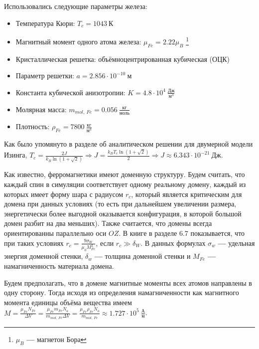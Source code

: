 \documentclass[oneside,final,14pt]{extarticle}
\begin{document}
	Использовались следующие параметры железа: 
	\begin{itemize}
	\item Температура Кюри: $T_c=1043 \ \text{К}$
	\item Магнитный момент одного атома железа: $\mu_{Fe}=2.22\mu_{B}$ \footnote{$\mu_{B}$ \textbf{---} магнетон Бора}
	\item Кристаллическая решетка: объёмноцентрированная кубическая (ОЦК)
	\item Параметр решетки: $a=2.856 \cdot 10^{-10} \ \text{м}$
	\item Константа кубической анизотропии: $K=4.8 \cdot 10^{4} \ \frac{\text{Дж}}{\text{м}^3}$
	\item Молярная масса: $m_{mol, \ Fe}=0.056 \ \frac{\text{кг}}{\text{моль}}$
	\item Плотность: $\rho_{Fe}=7800 \ \frac{\text{кг}}{\text{м}^3}$
	\end{itemize}
	
	Как было упомянуто в разделе об аналитическом решении для двумерной модели Изинга, $T_{c}=\frac{2J}{k_{B}\ln(1+\sqrt{2})} \Rightarrow J=\frac{k_{B}T_{c}\ln(1+\sqrt{2})}{2} \Rightarrow \boxed{J \approx 6.343 \cdot 10^{-21} \ \text{Дж}}$.

	Как известно, ферромагнетики имеют доменную структуру. Будем считать, что каждый спин в симуляции соответствует одному реальному домену, каждый из которых имеет форму шара с радиусом $r_{c}$, который является критическим для домена при данных условиях (то есть при дальнейшем увеличении размера, энергетически более выгодной оказывается конфигурация, в которой большой домен разбит на два меньших). Также считается, что домены всегда ориентированны параллельно оси $OZ$. В книге \cite{magn} в разделе 6.7 показывается, что при таких условиях $r_{c}=\frac{9\sigma_{W}}{\mu_{0}M_{Fe}^2}$, если $r_{c}\gg \delta_{W}$. В данных формулах $\sigma_{w}$ \textbf{---} удельная энергия доменной стенки, $\delta_{w}$ \textbf{---} толщина доменной стенки и $M_{Fe}$ \textbf{---} намагниченность материала домена. 

	Будем предполагать, что в домене магнитные моменты всех атомов направлены в одну сторону. Тогда исходя из определения намагниченности как магнитного момента единицы объёма вещества имеем $M=\frac{\mu_{Fe}N_{Fe}}{\Delta V}=\frac{\mu_{Fe}m_{Fe}N_{a}}{m_{mol, \ Fe}\Delta V}=\frac{\mu_{Fe}\rho_{Fe}N_{a}}{m_{mol, \ Fe}}\approx 1.727 \cdot 10^{5} \ \frac{\text{А}}{\text{м}}$.
\end{document}
